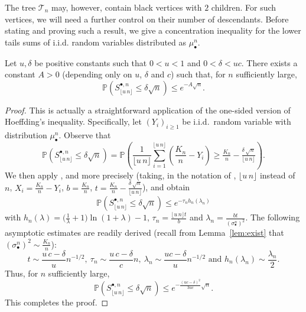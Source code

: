 \documentclass[AHL,XML,longabstracts,Unicode]{cedram}
\def\mubn{\mu_{\bullet}^{n}}
\def\sbn{\sigma_{\bullet}^{n}}
\def\Sbn{S^{\bullet,n}}
\def\Ts{\mathscr{T}}
\renewcommand\Pr[1]{\mathbb{P}\left(#1\right)}
\begin{document}
The tree $\Ts_{n}$ may, however, contain black vertices with $2$ children.
For such vertices, we will need a further control on their number of descendants.
Before stating and proving such a result, we give a concentration inequality for the lower tails sums of i.i.d. random variables distributed as $\mubn$.

\begin{lemma}
  Let $u, \delta$ be positive constants such that $0<u<1$ and $0<\delta<u c$. There exists a constant $A>0$ (depending only on $u$, $\delta$ and $c$)
  such that, for $n$ sufficiently large,
  \[\Pr{\Sbn_{\lfloor u\, n \rfloor} \le \delta \sqrt{n}}
  \le e^{-A\sqrt{n}}.\]
  \label{lem:Concentration}
\end{lemma}
\begin{proof}
This is actually a straightforward application of the one-sided version of  Hoeffding's inequality.
Specifically, let $(Y_{i})_{i \geq 1}$ be i.i.d.~random variable with distribution $\mubn$. Observe that
\[\Pr{\Sbn_{\lfloor u\, n \rfloor} \le \delta \sqrt{n}}= \Pr{ \frac{1}{\lfloor u\, n \rfloor} \sum_{i=1}^{\lfloor u\, n \rfloor} \left(  \frac{K_{n}}{n}-Y_{i} \right)  \geq \tfrac{K_n}{n}-\tfrac{\delta \, \sqrt{n}}{\lfloor u\, n\rfloor}}.\]
We then apply \cite[Theorem 3]{Hoeffding}, and more precisely \cite[Eq.~(2.12)]{Hoeffding} (taking, in the notation of \cite{Hoeffding}, $\lfloor u\, n \rfloor$ instead of $n$, $X_{i}= \tfrac{K_{n}}{n}-Y_{i}$, $b= \tfrac{K_{n}}{n}$, $t=\tfrac{K_n}{n}-\tfrac{\delta \, \sqrt{n}}{\lfloor u\, n\rfloor}$), and obtain
\[\Pr{\Sbn_{\lfloor u\, n \rfloor} \le \delta \sqrt{n}}
  \leq e^{-\tau_{n} h_{n}(\lambda_{n})}\]
  with $h_{n}(\lambda)= \big( \tfrac{1}{\lambda} +1\big)  \ln(1+\lambda)-1$, $\tau_{n}= \tfrac{\lfloor u\, n \rfloor t}{b}$ and $\lambda_{n}= \tfrac{bt}{(\sbn)^{2}}$. The following asymptotic estimates are readily derived
  (recall from Lemma~\ref{lem:exist} that $(\sbn)^{2} \sim \tfrac{K_n}{n}$):
  \[t \sim \frac{u \, c-\delta}{u} n^{-1/2},\ \tau_{n} \sim  \frac{u \, c-\delta}{c} n,\  \lambda_{n} \sim \frac{uc-\delta}{u} n^{-1/2}\text{ and }h_{n}(\lambda_{n}) \sim \frac{\lambda_{n}}{2}.\]
  Thus, for $n$ sufficiently large,
\[\Pr{\Sbn_{\lfloor u\, n \rfloor} \le \delta \sqrt{n}} \leq  e^{- \frac{(uc-\delta)^{2}}{3uc} \sqrt{n}}.\]
This completes the proof.
\end{proof}
\end{document}

